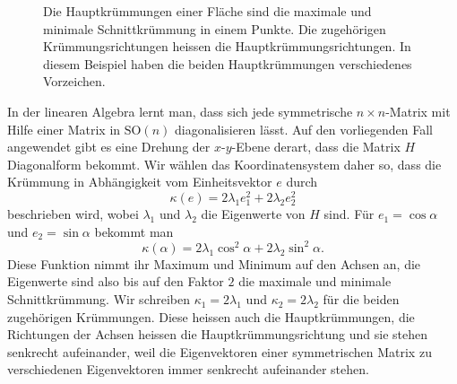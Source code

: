 \begin{figure}
\centering
{}
\caption{Die Hauptkrümmungen einer Fläche sind die maximale und minimale
Schnittkrümmung in einem Punkte.
Die zugehörigen Krümmungsrichtungen heissen die Hauptkrümmungsrichtungen.
In diesem Beispiel haben die beiden Hauptkrümmungen verschiedenes Vorzeichen.
\label{skript:kurven:hauptkruemmungen}}
\end{figure}

In der linearen Algebra lernt man, dass sich jede symmetrische
$n\times n$-Matrix 
mit Hilfe einer Matrix in $\textrm{SO}(n)$ diagonalisieren lässt.
Auf den vorliegenden Fall angewendet gibt es eine Drehung der
$x$-$y$-Ebene derart, dass
die Matrix $H$ Diagonalform bekommt.
Wir wählen das Koordinatensystem daher so, dass die
Krümmung in Abhängigkeit vom Einheitsvektor $e$ durch
\[
\kappa(e)
=
2\lambda_1 e_1^2 + 2\lambda_2 e_2^2
\]
beschrieben wird,
wobei $\lambda_1$ und $\lambda_2$ die Eigenwerte von $H$ sind.
Für $e_1=\cos\alpha$ und $e_2=\sin\alpha$ bekommt man
\[
\kappa(\alpha)
=
2\lambda_1 \cos^2\alpha + 2\lambda_2 \sin^2\alpha.
\]
Diese Funktion nimmt ihr Maximum und Minimum auf den Achsen an,
die Eigenwerte sind also bis auf den Faktor $2$ die maximale und minimale
Schnittkrümmung.
Wir schreiben $\kappa_1=2\lambda_1$ und $\kappa_2=2\lambda_2$ für die
beiden zugehörigen Krümmungen.
%
Diese heissen auch die Hauptkrümmungen, die Richtungen der Achsen heissen
die Hauptkrümmungsrichtung und sie stehen senkrecht aufeinander, weil
%
die Eigenvektoren einer symmetrischen Matrix zu verschiedenen Eigenvektoren
immer senkrecht aufeinander stehen.

